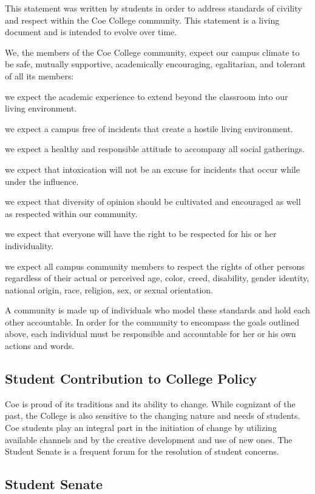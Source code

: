 \documentclass[
  letterpaper,
]{scrbook}
\begin{document}
This statement was written by students in order to address standards of
civility and respect within the Coe College community. This statement is
a living document and is intended to evolve over time.

We, the members of the Coe College community, expect our campus climate
to be safe, mutually supportive, academically encouraging, egalitarian,
and tolerant of all its members:

we expect the academic experience to extend beyond the classroom into
our living environment.

we expect a campus free of incidents that create a hostile living
environment.

we expect a healthy and responsible attitude to accompany all social
gatherings.

we expect that intoxication will not be an excuse for incidents that
occur while under the influence.

we expect that diversity of opinion should be cultivated and encouraged
as well as respected within our community.

we expect that everyone will have the right to be respected for his or
her individuality.

we expect all campus community members to respect the rights of other
persons regardless of their actual or perceived age, color, creed,
disability, gender identity, national origin, race, religion, sex, or
sexual orientation.

A community is made up of individuals who model these standards and hold
each other accountable. In order for the community to encompass the
goals outlined above, each individual must be responsible and
accountable for her or his own actions and words.

\subsection{Student Contribution to College
Policy}\label{student-contribution-to-college-policy}

Coe is proud of its traditions and its ability to change. While
cognizant of the past, the College is also sensitive to the changing
nature and needs of students. Coe students play an integral part in the
initiation of change by utilizing available channels and by the creative
development and use of new ones. The Student Senate is a frequent forum
for the resolution of student concerns.

\subsection{Student Senate}\label{student-senate}
\end{document}
